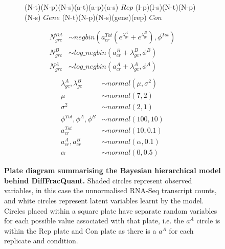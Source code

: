 \documentclass[../main.tex]{subfiles}
\begin{document}
\begin{figure} [t!]
\begin{subfigure}[b]{0.54\textwidth}
{        %
         {(N-t)(N-p)(N-s)(a-t)(a-p)(a-s)} {$Rep$}
         {(l-p)(l-s)(N-t)(N-p)(N-s)} {$Gene$}
         {(N-t)(N-p)(N-s)(gene)(rep)} {$Con$}
    }
    \end{subfigure}
     \hfill
     \begin{subfigure}[b]{0.44\textwidth}
     \centering
     \begin{align*}
        N^{Tot}_{grc} & \sim  negbin(a^{Tot}_{cr}(e^{\lambda^{A}_{gc}} + e^{\lambda^{B}_{gc}}), \phi^{Tot})\\
        N^{B}_{grc} & \sim  log\_negbin(a^{B}_{cr}+\lambda^{B}_{gc}, \phi^{B})\\
        N^{A}_{grc} & \sim  log\_negbin(a^{A}_{cr}+\lambda^{A}_{gc}, \phi^{A})\\
     \end{align*}
     \begin{align*}
        \lambda^{A}_{gc}, \lambda^{B}_{gc} &\sim normal(\mu, \sigma^2)\\
        \mu &\sim normal(7,2)\\
        \sigma^2&\sim normal(2,1)\\
        \phi^{Tot}, \phi^{A}, \phi^{B}&\sim normal(100,10)\\
        a^{Tot}_{cr}&\sim normal(10, 0.1)\\
        a^{A}_{cr}, a^{B}_{cr}&\sim normal(\alpha, 0.1)\\
        \alpha&\sim normal(0, 0.5)
    \end{align*}
    \vspace{0.5cm}
     \end{subfigure}
     \caption[Overview of DiffFracQuant Model.]{\textbf{Plate diagram summarising the Bayesian hierarchical model behind DiffFracQuant.} Shaded circles represent observed variables, in this case the unnormalised RNA-Seq transcript counts, and white circles represent latent variables learnt by the model. Circles placed within a square plate have separate random variables for each possible value associated with that plate, i.e. the $a^{A}$ circle is within the Rep plate and Con plate as there is a $a^{A}$ for each replicate and condition.}
     \label{fig:DiffFracQuant-plate-diagram}
\end{figure}
\end{document}
